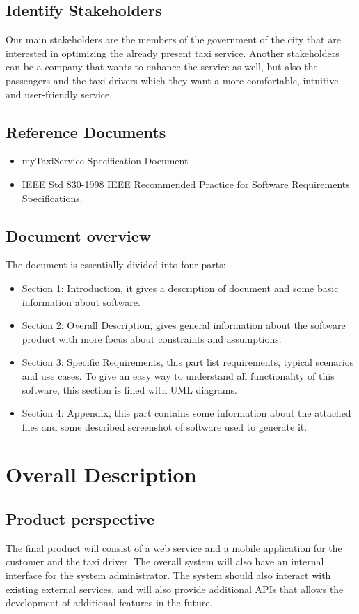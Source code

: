 \documentclass[a4paper,12pt]{article}%
\newcounter{assumptions_counter}
\newcounter{func_req_counter}
\begin{document}
\subsection{Identify Stakeholders}
Our main stakeholders are the members of the government of the city that are interested in optimizing the already present taxi service.
Another stakeholders can be a company that wants to enhance the service as well, but also the passengers and the taxi drivers which they want a more comfortable, intuitive and user-friendly service.
\subsection{Reference Documents}
\begin{itemize}
\item myTaxiService Specification Document
\item IEEE Std 830-1998 IEEE Recommended Practice for Software 
Requirements Specifications.
\end{itemize}
\subsection{Document overview}
The document is essentially divided into four parts:
\begin{itemize}
\item Section 1: Introduction, it gives a description of document and some basic information about software.
\item Section 2: Overall Description, gives general information about the software product with more focus about constraints and assumptions.
\item Section 3: Specific Requirements, this part list requirements, typical scenarios and use cases. To give an easy way to understand all functionality
of this software, this section is filled with UML diagrams.
\item  Section 4: Appendix, this part contains some information about the attached files and some described screenshot of software used to generate
it.
\end{itemize}
\newpage
\section{Overall Description}
\subsection{Product perspective}
The final product will consist of a web service and a mobile application for the customer and the taxi driver.
The overall system will also have an internal interface for the system administrator. The system should also interact with existing external services, and will also provide additional APIs that allows the development of additional features in the future. 
\end{document}
